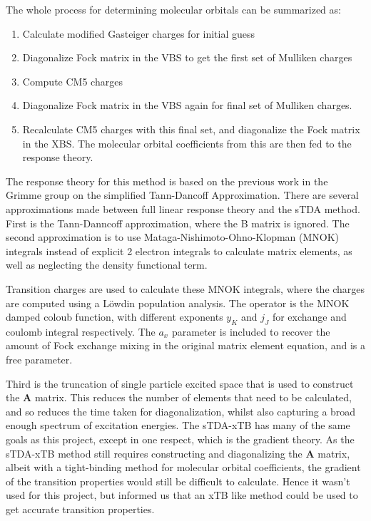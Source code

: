 The whole process for determining molecular orbitals can be summarized as:
\begin{enumerate}
	\item Calculate modified Gasteiger charges for initial guess
	\item Diagonalize Fock matrix in the VBS to get the first set of Mulliken charges
	\item Compute CM5 charges
	\item Diagonalize Fock matrix in the VBS again for final set of Mulliken charges.
	\item Recalculate CM5 charges with this final set, and diagonalize the Fock matrix in the XBS. The molecular orbital coefficients from this are then fed to the response theory.
\end{enumerate}

The response theory for this method is based on the previous work in the Grimme 
group on the simplified Tann-Dancoff Approximation. There are several approximations 
made between full linear response theory and the sTDA method. First is the 
Tann-Danncoff approximation, where the B matrix is ignored. The second approximation 
is to use Mataga-Nishimoto-Ohno-Klopman (MNOK) integrals instead of explicit 2 electron 
integrals to calculate matrix elements, as well as neglecting the density 
functional term. 

Transition charges are used to calculate these MNOK integrals, where the charges 
are computed using a Löwdin population analysis. The operator is the 
MNOK\cite{Nishimoto1957}\cite{Ohno1964}\cite{Klopman1964} damped coloub function, 
with different exponents $y_K$ and $j_J$ for exchange and coulomb integral respectively. 
The $a_x$ parameter is included to recover the amount of Fock exchange mixing in
the original matrix element equation, and is a free parameter.

Third is the truncation of single particle excited space that is used to construct 
the $\mathbf{A}$ matrix. This reduces the number of elements that need to be 
calculated, and so reduces the time taken for diagonalization, whilst also capturing 
a broad enough spectrum of excitation energies. The sTDA-xTB has many of the same 
goals as this project, except in one respect, which is the gradient theory. As 
the sTDA-xTB method still requires constructing and diagonalizing the $\mathbf{A}$ 
matrix, albeit with a tight-binding method for molecular orbital coefficients, 
the gradient of the transition properties would still be difficult to calculate. 
Hence it wasn't used for this project, but informed us that an xTB like method 
could be used to get accurate transition properties.

